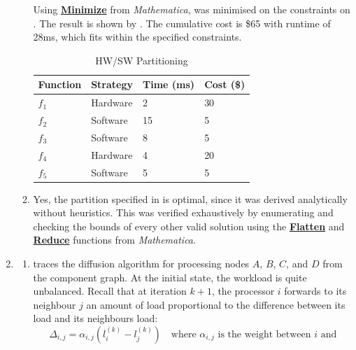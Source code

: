 \documentclass{article}
\newcommand\mma[1]%
    {\href{https://reference.wolfram.com/language/ref/#1.html}{\textbf{#1}}}
\numberwithin{equation}{section}
\numberwithin{table}{section}
\numberwithin{figure}{section}
\begin{document}
\begin{enumerate}
\begin{enumerate}
            Using \mma{Minimize} from \emph{Mathematica},
             was minimised on the constraints on
            . The result is shown by
            . The cumulative cost is \$65 with runtime
            of 28ms, which fits within the specified constraints.
            \begin{table}
                \centering%
                \begin{tabular}{llll}
                    Function & Strategy & Time (ms) & Cost (\$) \\
                    \toprule
                    $f_1$ & Hardware & 2 & 30 \\
                    $f_2$ & Software & 15 & 5 \\
                    $f_3$ & Software & 8 & 5 \\
                    $f_4$ & Hardware & 4 & 20 \\
                    $f_5$ & Software & 5 & 5 \\
                    \bottomrule
                \end{tabular}
                \caption{HW/SW Partitioning}%
                \label{table:partitioning}
            \end{table}
        \item Yes, the partition specified in  is
            optimal, since it was derived analytically without heuristics. This
            was verified exhaustively by enumerating and checking the bounds of
            every other valid solution using the \mma{Flatten} and \mma{Reduce}
            functions from \emph{Mathematica}.
    \end{enumerate}
    \item \begin{enumerate}
        \item {} traces the diffusion algorithm for
            processing nodes $A$, $B$, $C$, and $D$ from the component graph. At
            the initial state, the workload is quite unbalanced. Recall that at
            iteration $k+1$, the processor $i$ forwards to its neighbour $j$ an
            amount of load proportional to the difference between its load and
            its neighbours load:
            \begin{equation}
                \Delta_{i,j} = \alpha_{i,j}\left( l_i^{(k)} - l_j^{(k)} \right)
                \quad \text{where $\alpha_{i,j}$ is the weight between $i$ and
}
\end{equation}
\end{enumerate}
\end{enumerate}
\end{document}
